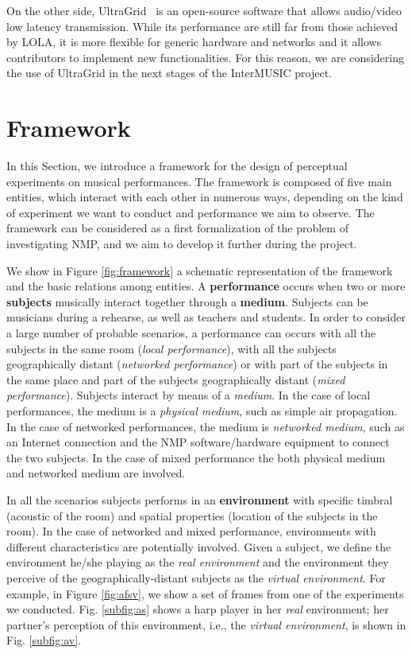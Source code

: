 \documentclass[conference]{IEEEtran}
\begin{document}
On the other side, UltraGrid~\cite{holub2006high} is an open-source software that allows audio/video low latency transmission. While its performance are still far from those achieved by LOLA, it is more flexible for generic hardware and networks and it allows contributors to implement  new functionalities. For this reason, we are considering the use of UltraGrid in the next stages of the InterMUSIC project.
\section{Framework}\label{sec:framework}
In this Section, we introduce a framework for the design of perceptual experiments on musical performances. The framework is composed of five main entities, which interact with each other in numerous ways, depending on the kind of experiment we want to conduct and performance we aim to observe. The framework can be considered as a first formalization of the problem of investigating NMP, and we aim to develop it further during the project.

We show in Figure \ref{fig:framework} a schematic representation of the framework and the basic relations among entities. A \textbf{performance} occurs when two or more \textbf{subjects} musically interact together through a \textbf{medium}. Subjects can be musicians during a rehearse, as well as teachers and students. In order to consider a large number of probable scenarios, a performance can occurs with all the subjects in the same room (\textit{local performance}), with all the subjects geographically distant (\textit{networked performance}) or with part of the subjects in the same place and part of the subjects geographically distant (\textit{mixed performance}). Subjects interact by means of a \textit{medium}. In the case of local performances, the medium is a \textit{physical medium}, such as simple air propagation. In the case of networked performances, the medium is \textit{networked medium}, such as an Internet connection and the NMP software/hardware equipment to connect the two subjects. In the case of mixed performance the both physical medium and networked medium are involved. 

In all the scenarios subjects performs in an \textbf{environment} with specific timbral (acoustic of the room) and spatial properties (location of the subjects in the room). In the case of networked and mixed performance, environments with different characteristics are potentially involved. Given a subject, we define the environment he/she playing as the \textit{real environment} and the environment they perceive of the geographically-distant subjects as the \textit{virtual environment}. For example, in Figure \ref{fig:afsv}, we show a set of frames from one of the experiments we conducted. Fig. \ref{subfig:as} shows a harp player in her \textit{real} environment; her partner's perception of this environment, i.e., the \textit{virtual environment}, is shown in Fig. \ref{subfig:av}. 
\end{document}
